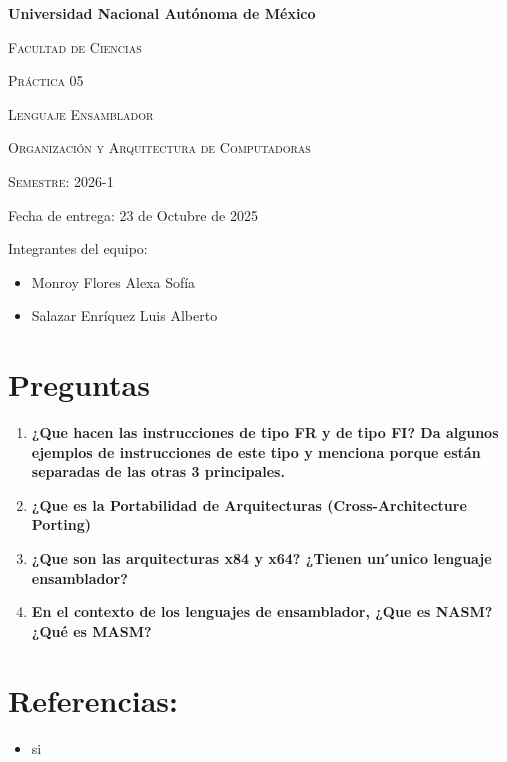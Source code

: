 \documentclass{article}
\begin{document}
  \begin{titlepage}
  	\vspace*{0.8cm}
  	\centering
  	{\bfseries\huge Universidad Nacional Autónoma de México \par}
  	\vspace{1cm}
  	{\scshape\huge Facultad de Ciencias \par}
  	\vspace{2cm}
  	{\scshape\Huge Práctica 05 \par}
  	\vfill
		{\scshape\Large Lenguaje Ensamblador \par}
  	\vspace{1.5cm}
  	{\scshape\Large Organización y Arquitectura de Computadoras \par}
  	\vfill
  	{\scshape\Large Semestre: 2026-1\par}
  	\vspace{1.5cm}
		{\Large Fecha de entrega: 23 de Octubre de 2025\par}
		\vspace{1.5cm}
		{\Large Integrantes del equipo:\par}
		\begin {itemize}
		\item Monroy Flores Alexa Sofía
		\item Salazar Enríquez Luis Alberto
		\end{itemize}
  \end{titlepage}

	\pagestyle{fancy}
	\section*{Preguntas}
  \begin{enumerate}
    \item \textbf{¿Que hacen las instrucciones de tipo FR y de tipo FI? Da algunos ejemplos de instrucciones de este tipo y menciona porque están separadas de las otras 3 principales.\\}
    \item \textbf{¿Que es la Portabilidad de Arquitecturas (Cross-Architecture Porting)\\}
    \item \textbf{¿Que son las arquitecturas x84 y x64? ¿Tienen un  ́unico lenguaje ensamblador?\\}
    \item \textbf{En el contexto de los lenguajes de ensamblador, ¿Que es NASM? ¿Qué es MASM?\\}
  \end{enumerate}
  \section*{Referencias:}
		\begin{itemize}
			\item si
		\end{itemize}
	\restoregeometry
\end{document}
